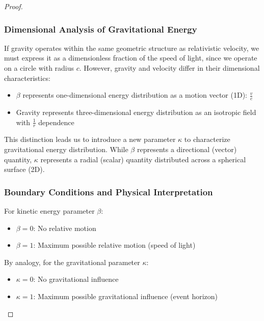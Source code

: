 \documentclass{article}
\begin{document}
\begin{theorem}
\begin{proof}
\begin{center}
\end{center}

\subsubsection{Dimensional Analysis of Gravitational Energy}

If gravity operates within the same geometric structure as relativistic velocity, we must express it as a dimensionless fraction of the speed of light, since we operate on a circle with radius $c$. However, gravity and velocity differ in their dimensional characteristics:

\begin{itemize}
    \item $\beta$ represents one-dimensional energy distribution as a motion vector (1D): $\frac{v}{c}$
    \item Gravity represents three-dimensional energy distribution as an isotropic field with $\frac{1}{r}$ dependence
\end{itemize}

This distinction leads us to introduce a new parameter $\kappa$ to characterize gravitational energy distribution. While $\beta$ represents a directional (vector) quantity, $\kappa$ represents a radial (scalar) quantity distributed across a spherical surface (2D).

\subsubsection{Boundary Conditions and Physical Interpretation}

For kinetic energy parameter $\beta$:
\begin{itemize}
    \item $\beta = 0$: No relative motion
    \item $\beta = 1$: Maximum possible relative motion (speed of light)
\end{itemize}

By analogy, for the gravitational parameter $\kappa$:
\begin{itemize}
    \item $\kappa = 0$: No gravitational influence
    \item $\kappa = 1$: Maximum possible gravitational influence (event horizon)
\end{itemize}


\end{proof}
\end{theorem}
\end{document}
